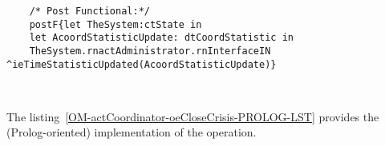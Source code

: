 	\scriptsize
	\vspace{0.5cm}
	\begin{lstlisting}[style=MessirStyle,firstnumber=auto,captionpos=b,caption={\msrmessir (MCL-oriented) specification of the operation \emph{oeCloseCrisis}.},label=OM-actCoordinator-oeCloseCrisis-MCL-LST]

	
	
	/* Post Functional:*/ 
	postF{let TheSystem:ctState in
	let AcoordStatisticUpdate: dtCoordStatistic in
	TheSystem.rnactAdministrator.rnInterfaceIN ^ieTimeStatisticUpdated(AcoordStatisticUpdate)}
	
	
	\end{lstlisting}
	\normalsize 
	
	
	
	
	
	\vspace{1cm}
	The listing~\ref{OM-actCoordinator-oeCloseCrisis-PROLOG-LST} provides the \msrmessir (Prolog-oriented) implementation of the operation.
	
	\scriptsize
	\vspace{0.5cm}
	
	
	\normalsize





